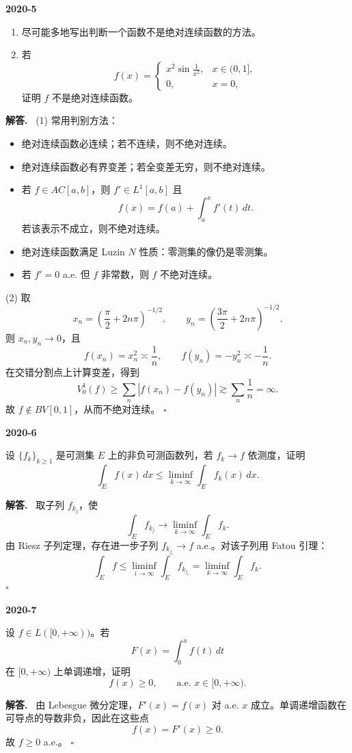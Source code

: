 \documentclass[UTF8]{ctexart}
\newenvironment{problem}[1]{\par\medskip\noindent\textbf{#1}\par\smallskip}{\par}
\newenvironment{solution}{\par\noindent\textbf{解答.}\ }{\hfill$\square$\par\medskip}
\begin{document}
\begin{problem}{2020-5}
\begin{enumerate}[label=(\arabic*)]
  \item 尽可能多地写出判断一个函数不是绝对连续函数的方法。
  \item 若
  \[
    f(x)=
    \begin{cases}
      x^2\sin\frac1{x^2}, & x\in(0,1],\\
      0, & x=0,
    \end{cases}
  \]
  证明 \(f\) 不是绝对连续函数。
\end{enumerate}
\end{problem}
\begin{solution}
(1) 常用判别方法：
\begin{itemize}
  \item 绝对连续函数必连续；若不连续，则不绝对连续。
  \item 绝对连续函数必有界变差；若全变差无穷，则不绝对连续。
  \item 若 \(f\in AC[a,b]\)，则 \(f'\in L^1[a,b]\) 且
  \[
    f(x)=f(a)+\int_a^x f'(t)\,dt.
  \]
  若该表示不成立，则不绝对连续。
  \item 绝对连续函数满足 Luzin \(N\) 性质：零测集的像仍是零测集。
  \item 若 \(f'=0\) a.e. 但 \(f\) 非常数，则 \(f\) 不绝对连续。
\end{itemize}

(2) 取
\[
  x_n=\left(\frac{\pi}{2}+2n\pi\right)^{-1/2},\qquad
  y_n=\left(\frac{3\pi}{2}+2n\pi\right)^{-1/2}.
\]
则 \(x_n,y_n\to0\)，且
\[
  f(x_n)=x_n^2\asymp \frac1n,\qquad f(y_n)=-y_n^2\asymp-\frac1n.
\]
在交错分割点上计算变差，得到
\[
  V_0^1(f)\ge \sum_n |f(x_n)-f(y_n)|\gtrsim \sum_n\frac1n=\infty.
\]
故 \(f\notin BV[0,1]\)，从而不绝对连续。
\end{solution}

\begin{problem}{2020-6}
设 \(\{f_k\}_{k\ge1}\) 是可测集 \(E\) 上的非负可测函数列，若 \(f_k\to f\) 依测度，证明
\[
  \int_E f(x)\,dx\le \liminf_{k\to\infty}\int_E f_k(x)\,dx.
\]
\end{problem}
\begin{solution}
取子列 \(f_{k_j}\)，使
\[
  \int_E f_{k_j}\to \liminf_{k\to\infty}\int_E f_k.
\]
由 Riesz 子列定理，存在进一步子列 \(f_{k_{j_i}}\to f\) a.e.。对该子列用 Fatou 引理：
\[
  \int_E f\le \liminf_{i\to\infty}\int_E f_{k_{j_i}}
  =\liminf_{k\to\infty}\int_E f_k.
\]
\end{solution}

\begin{problem}{2020-7}
设 \(f\in L([0,+\infty))\)。若
\[
  F(x)=\int_0^x f(t)\,dt
\]
在 \([0,+\infty)\) 上单调递增，证明
\[
  f(x)\ge0,\qquad \text{a.e. }x\in[0,+\infty).
\]
\end{problem}
\begin{solution}
由 Lebesgue 微分定理，\(F'(x)=f(x)\) 对 a.e. \(x\) 成立。单调递增函数在可导点的导数非负，因此在这些点
\[
  f(x)=F'(x)\ge0.
\]
故 \(f\ge0\) a.e.。
\end{solution}
\end{document}
